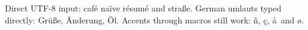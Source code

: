 \documentclass{article}
\begin{document}
Direct UTF-8 input: café naïve résumé and straße.
German umlauts typed directly: Grüße, Änderung, Öl.
Accents through macros still work: \~n, \c{c}, \aa\ and \o.
\end{document}
